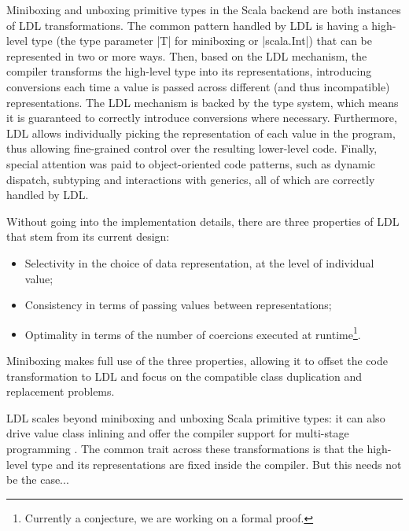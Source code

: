 Miniboxing and unboxing primitive types in the Scala backend are both instances of LDL transformations. The common pattern handled by LDL is having a high-level type (the type parameter |T| for miniboxing or |scala.Int|) that can be represented in two or more ways. Then, based on the LDL mechanism, the compiler transforms the high-level type into its representations, introducing conversions each time a value is passed across different (and thus incompatible) representations. The LDL mechanism is backed by the type system, which means it is guaranteed to correctly introduce conversions where necessary. Furthermore, LDL allows individually picking the representation of each value in the program, thus allowing fine-grained control over the resulting lower-level code. Finally, special attention was paid to object-oriented code patterns, such as dynamic dispatch, subtyping and interactions with generics, all of which are correctly handled by LDL.

Without going into the implementation details, there are three properties of LDL that stem from its current design:

\begin{itemize}
  \item Selectivity in the choice of data representation, at the level of individual value;
  \item Consistency in terms of passing values between representations; %
  \item Optimality in terms of the number of coercions executed at runtime\footnote{Currently a conjecture, we are working on a formal proof.}.
\end{itemize}

Miniboxing makes full use of the three properties, allowing it to offset the code transformation to LDL and focus on the compatible class duplication and replacement problems.

LDL scales beyond miniboxing and unboxing Scala primitive types: it can also drive value class inlining \cite{gosling-value-classes,rose-value-classes-tearing,rose-value-classes-vm} and offer the compiler support for multi-stage programming \cite{tiark-lms, scala-virtualized}. The common trait across these transformations is that the high-level type and its representations are fixed inside the compiler. But this needs not be the case...

%
%
%
%

